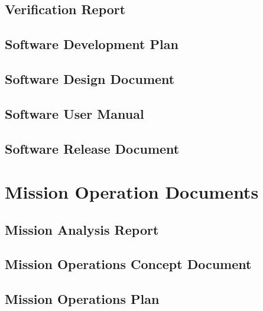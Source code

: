 \subsection{Verification Report}
\label{sec:Verification Report}


\subsection{Software Development Plan}
\label{sec:Software Development Plan}


\subsection{Software Design Document}
\label{sec:Software Design Document}


\subsection{Software User Manual}
\label{sec:Software User Manual}


\subsection{Software Release Document}
\label{sec:Software Release Document}

\section{Mission Operation Documents}


\subsection{Mission Analysis Report}
\label{sec:Mission Analysis Report}


\subsection{Mission Operations Concept Document}
\label{sec:Mission Operations Concept Document}


\subsection{Mission Operations Plan}
\label{sec:Mission Operations Plan}


